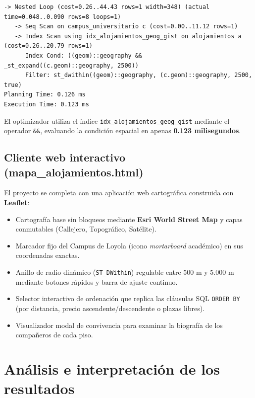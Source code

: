 \documentclass[a4paper,12pt]{article}
\begin{document}
\begin{lstlisting}[caption={Salida real del optimizador PostgreSQL (EXPLAIN ANALYZE)}]
-> Nested Loop (cost=0.26..44.43 rows=1 width=348) (actual time=0.048..0.090 rows=8 loops=1)
   -> Seq Scan on campus_universitario c (cost=0.00..11.12 rows=1)
   -> Index Scan using idx_alojamientos_geog_gist on alojamientos a (cost=0.26..20.79 rows=1)
      Index Cond: ((geom)::geography && _st_expand((c.geom)::geography, 2500))
      Filter: st_dwithin((geom)::geography, (c.geom)::geography, 2500, true)
Planning Time: 0.126 ms
Execution Time: 0.123 ms
\end{lstlisting}

El optimizador utiliza el índice \texttt{idx\_alojamientos\_geog\_gist} mediante el operador \texttt{\&\&}, evaluando la condición espacial en apenas \textbf{0.123 milisegundos}.

\subsection{Cliente web interactivo (mapa\_alojamientos.html)}
El proyecto se completa con una aplicación web cartográfica construida con \textbf{Leaflet}:
\begin{itemize}[leftmargin=1.0cm]
  \item Cartografía base sin bloqueos mediante \textbf{Esri World Street Map} y capas conmutables (Callejero, Topográfico, Satélite).
  \item Marcador fijo del Campus de Loyola (icono \textit{mortarboard} académico) en sus coordenadas exactas.
  \item Anillo de radio dinámico (\texttt{ST\_DWithin}) regulable entre 500 m y 5.000 m mediante botones rápidos y barra de ajuste continuo.
  \item Selector interactivo de ordenación que replica las cláusulas SQL \texttt{ORDER BY} (por distancia, precio ascendente/descendente o plazas libres).
  \item Visualizador modal de convivencia para examinar la biografía de los compañeros de cada piso.
\end{itemize}

\section{Análisis e interpretación de los resultados}
\end{document}
